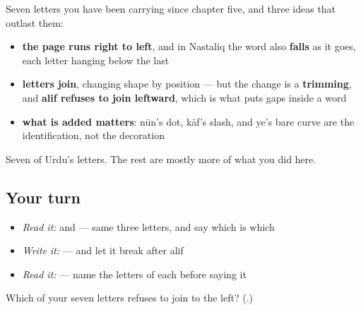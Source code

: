 \begin{grammarlens}[title={What you've built this chapter}]
Seven letters you have been carrying since chapter five, and three ideas that outlast them:

\begin{itemize}
\raggedright
  \item \textbf{the page runs right to left}, and in Nastaliq the word also \textbf{falls} as it goes, each letter hanging below the last
  \item \textbf{letters join}, changing shape by position — but the change is a \textbf{trimming}, and \textbf{alif refuses to join leftward}, which is what puts gaps inside a word
  \item \textbf{what is added matters}: nūn's dot, kāf's slash, and ye's bare curve are the identification, not the decoration
\end{itemize}

Seven of Urdu's letters. The rest are mostly more of what you did here.
\end{grammarlens}

\subsection*{Your turn}
\begin{itemize}
\raggedright
  \item \emph{Read it:}  and  — same three letters, and say which is which
  \item \emph{Write it:}  — and let it break after alif
  \item \emph{Read it:}    — name the letters of each before saying it
\end{itemize}

\begin{tcolorbox}[breakable,colback=teal!4,colframe=teal!35!black,title={Before you move on}]
Which of your seven letters refuses to join to the left? (\textbf{}.)
\end{tcolorbox}
